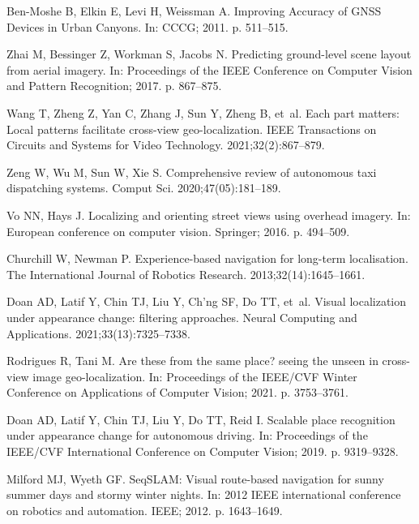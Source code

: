 \documentclass[10pt,letterpaper]{article}
\begin{document}
\nolinenumbers

\begin{thebibliography}{10}

  Ben-Moshe B, Elkin E, Levi H, Weissman A.
  \newblock Improving Accuracy of GNSS Devices in Urban Canyons.
  \newblock In: CCCG; 2011. p. 511--515.
  
  Zhai M, Bessinger Z, Workman S, Jacobs N.
  \newblock Predicting ground-level scene layout from aerial imagery.
  \newblock In: Proceedings of the IEEE Conference on Computer Vision and Pattern
    Recognition; 2017. p. 867--875.
  
  Wang T, Zheng Z, Yan C, Zhang J, Sun Y, Zheng B, et~al.
  \newblock Each part matters: Local patterns facilitate cross-view
    geo-localization.
  \newblock IEEE Transactions on Circuits and Systems for Video Technology.
    2021;32(2):867--879.
  
  Zeng W, Wu M, Sun W, Xie S.
  \newblock Comprehensive review of autonomous taxi dispatching systems.
  \newblock Comput Sci. 2020;47(05):181--189.
  
  Vo NN, Hays J.
  \newblock Localizing and orienting street views using overhead imagery.
  \newblock In: European conference on computer vision. Springer; 2016. p.
    494--509.
  
  Churchill W, Newman P.
  \newblock Experience-based navigation for long-term localisation.
  \newblock The International Journal of Robotics Research.
    2013;32(14):1645--1661.
  
  Doan AD, Latif Y, Chin TJ, Liu Y, Ch’ng SF, Do TT, et~al.
  \newblock Visual localization under appearance change: filtering approaches.
  \newblock Neural Computing and Applications. 2021;33(13):7325--7338.
  
  Rodrigues R, Tani M.
  \newblock Are these from the same place? seeing the unseen in cross-view image
    geo-localization.
  \newblock In: Proceedings of the IEEE/CVF Winter Conference on Applications of
    Computer Vision; 2021. p. 3753--3761.
  
  Doan AD, Latif Y, Chin TJ, Liu Y, Do TT, Reid I.
  \newblock Scalable place recognition under appearance change for autonomous
    driving.
  \newblock In: Proceedings of the IEEE/CVF International Conference on Computer
    Vision; 2019. p. 9319--9328.
  
  Milford MJ, Wyeth GF.
  \newblock SeqSLAM: Visual route-based navigation for sunny summer days and
    stormy winter nights.
  \newblock In: 2012 IEEE international conference on robotics and automation.
    IEEE; 2012. p. 1643--1649.
  

\end{thebibliography}
\end{document}

